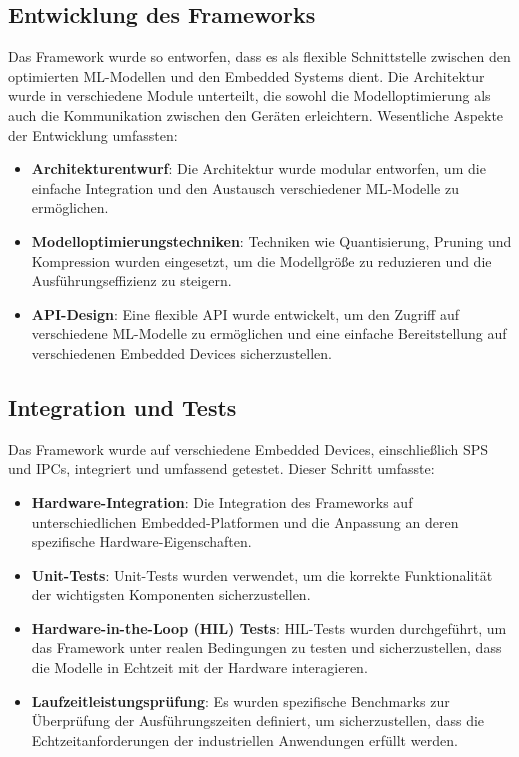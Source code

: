 \subsection{Entwicklung des Frameworks}
Das Framework wurde so entworfen, dass es als flexible Schnittstelle zwischen den optimierten ML-Modellen und den Embedded Systems dient. Die Architektur wurde 
in verschiedene Module unterteilt, die sowohl die Modelloptimierung als auch die Kommunikation zwischen den Geräten erleichtern. Wesentliche Aspekte der 
Entwicklung umfassten:

\begin{itemize}
    \item \textbf{Architekturentwurf}: Die Architektur wurde modular entworfen, um die einfache Integration und den Austausch verschiedener ML-Modelle zu ermöglichen.
    \item \textbf{Modelloptimierungstechniken}: Techniken wie Quantisierung, Pruning und Kompression wurden eingesetzt, um die Modellgröße zu reduzieren und die 
    Ausführungseffizienz zu steigern.
    \item \textbf{API-Design}: Eine flexible API wurde entwickelt, um den Zugriff auf verschiedene ML-Modelle zu ermöglichen und eine einfache 
    Bereitstellung auf verschiedenen Embedded Devices sicherzustellen.
\end{itemize}

\subsection{Integration und Tests}
Das Framework wurde auf verschiedene Embedded Devices, einschließlich SPS und IPCs, integriert und umfassend getestet. Dieser Schritt umfasste:

\begin{itemize}
    \item \textbf{Hardware-Integration}: Die Integration des Frameworks auf unterschiedlichen Embedded-Platformen und die Anpassung an deren spezifische 
    Hardware-Eigenschaften.
    \item \textbf{Unit-Tests}: Unit-Tests wurden verwendet, um die korrekte Funktionalität der wichtigsten Komponenten sicherzustellen.
    \item \textbf{Hardware-in-the-Loop (HIL) Tests}: HIL-Tests wurden durchgeführt, um das Framework unter realen Bedingungen zu testen und sicherzustellen, 
    dass die Modelle in Echtzeit mit der Hardware interagieren.
    \item \textbf{Laufzeitleistungsprüfung}: Es wurden spezifische Benchmarks zur Überprüfung der Ausführungszeiten definiert, um sicherzustellen, 
    dass die Echtzeitanforderungen der industriellen Anwendungen erfüllt werden.
\end{itemize}

